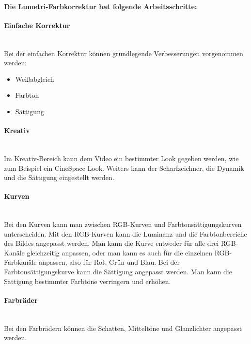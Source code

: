 \paragraph{Die Lumetri-Farbkorrektur hat folgende Arbeitsschritte:} 
\leavevmode
\paragraph{Einfache Korrektur}
\leavevmode \\
Bei der einfachen Korrektur können grundlegende Verbesserungen vorgenommen werden: 
\begin{itemize}
	\item Weißabgleich
	\item Farbton
	\item Sättigung
\end{itemize}
\paragraph{Kreativ}
\leavevmode \\
Im Kreativ-Bereich kann dem Video ein bestimmter Look gegeben werden, wie zum Beispiel ein CineSpace Look. Weiters kann der Scharfzeichner, die Dynamik und die Sättigung eingestellt werden.
\paragraph{Kurven}
\leavevmode \\
Bei den Kurven kann man zwischen RGB-Kurven und Farbtonsättigungskurven unterscheiden.\newline
Mit den RGB-Kurven kann die Luminanz und die Farbtonbereiche des Bildes angepasst werden. Man kann die Kurve entweder für alle drei RGB-Kanäle gleichzeitig anpassen, oder man kann es auch für die einzelnen RGB-Farbkanäle anpassen, also für Rot, Grün und Blau.\newline
Bei der Farbtonsättigungskurve kann die Sättigung angepasst werden. Man kann die Sättigung bestimmter Farbtöne verringern und erhöhen.
\paragraph{Farbräder}
\leavevmode \\
Bei den Farbrädern können die Schatten, Mitteltöne und Glanzlichter angepasst werden.
